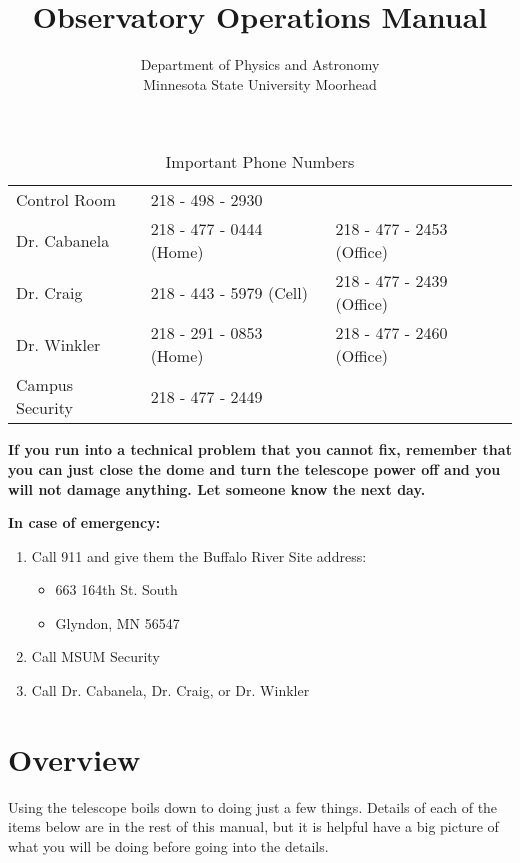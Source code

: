 \documentclass[letterpaper, 12pt]{report}
\begin{document}
\title{Observatory Operations Manual}
\author{Department of Physics and Astronomy\\
	Minnesota State University Moorhead}
\maketitle
\tableofcontents
\newpage

\begin{table}[]
	\centering
	\caption{Important Phone Numbers}
	\label{my-label}
	\begin{tabular}{lll}
		\hline
		Control Room    & 218 - 498 - 2930        &                           \\ 
		Dr. Cabanela    & 218 - 477 - 0444 (Home) & 218 - 477 - 2453 (Office) \\
		Dr. Craig       & 218 - 443 - 5979 (Cell) & 218 - 477 - 2439 (Office) \\
		Dr. Winkler     & 218 - 291 - 0853 (Home) & 218 - 477 - 2460 (Office) \\ 
		Campus Security & 218 - 477 - 2449        &                           \\ 
	\end{tabular}
\end{table}

\textbf{If you run into a technical problem that you cannot fix, remember that you can just close the dome and turn the telescope power off and you will not damage anything. Let someone know the next day.} \\

\vspace{.25in}

{\huge\textbf{In case of emergency:}}
\begin{enumerate}
	\item Call 911 and give them the Buffalo River Site address:
	\begin{itemize}
		\item [] 663 164th St. South
		\item [] Glyndon, MN 56547
	\end{itemize}
	\item Call MSUM Security
	\item Call Dr. Cabanela, Dr. Craig, or Dr. Winkler
\end{enumerate}

\newpage

\chapter{Overview} \label{ch:1}
Using the telescope boils down to doing just a few things. Details of each of the items below are in the rest of this manual, but it is helpful have a big picture of what you will be doing before going into the details.
\end{document}
